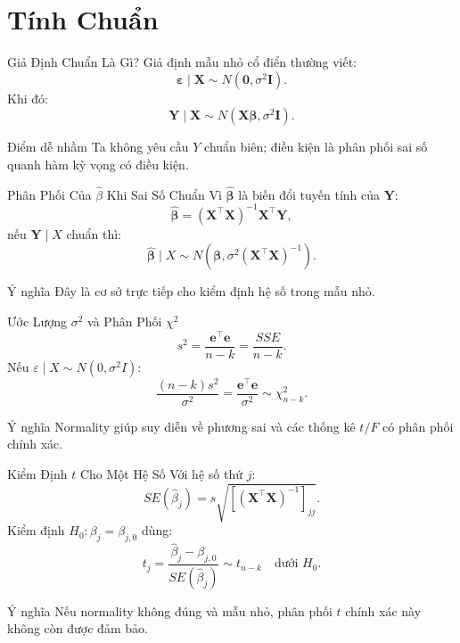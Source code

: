 \documentclass[aspectratio=169,professionalfonts]{beamer}
\newcommand{\assumption}[2]{%
  \begin{block}{#1}
    #2
  \end{block}
}
\newcommand{\mathnote}[1]{%
  \begin{block}{Ý nghĩa}
    #1
  \end{block}
}
\begin{document}
\section{Tính Chuẩn}
\begin{frame}{Giả Định Chuẩn Là Gì?}
  \small
  Giả định mẫu nhỏ cổ điển thường viết:
  \[
    \boldsymbol{\varepsilon}\mid\mathbf{X}\sim
    N(\mathbf{0},\sigma^2\mathbf{I}).
  \]
  Khi đó:
  \[
    \mathbf{Y}\mid\mathbf{X}
    \sim
    N(\mathbf{X}\boldsymbol{\beta},\sigma^2\mathbf{I}).
  \]
  \assumption{Điểm dễ nhầm}{Ta không yêu cầu $Y$ chuẩn biên; điều kiện là phân phối sai số quanh hàm kỳ vọng có điều kiện.}
\end{frame}

\begin{frame}{Phân Phối Của \texorpdfstring{$\hat\beta$}{beta-hat} Khi Sai Số Chuẩn}
  \small
  Vì $\hat{\boldsymbol{\beta}}$ là biến đổi tuyến tính của $\mathbf{Y}$:
  \[
    \hat{\boldsymbol{\beta}}
    =
    (\mathbf{X}^{\top}\mathbf{X})^{-1}\mathbf{X}^{\top}\mathbf{Y},
  \]
  nếu $\mathbf{Y}\mid X$ chuẩn thì:
  \[
    \hat{\boldsymbol{\beta}}\mid X
    \sim
    N\left(
      \boldsymbol{\beta},
      \sigma^2(\mathbf{X}^{\top}\mathbf{X})^{-1}
    \right).
  \]
  \mathnote{Đây là cơ sở trực tiếp cho kiểm định hệ số trong mẫu nhỏ.}
\end{frame}

\begin{frame}{Ước Lượng \texorpdfstring{$\sigma^2$}{sigma2} và Phân Phối \texorpdfstring{$\chi^2$}{chi-square}}
  \small
  \[
    s^2=\frac{\mathbf{e}^{\top}\mathbf{e}}{n-k}
    =\frac{SSE}{n-k}.
  \]
  Nếu $\varepsilon\mid X\sim N(0,\sigma^2I)$:
  \[
    \frac{(n-k)s^2}{\sigma^2}
    =
    \frac{\mathbf{e}^{\top}\mathbf{e}}{\sigma^2}
    \sim
    \chi^2_{n-k}.
  \]
  \begin{block}{Ý nghĩa}
    Normality giúp suy diễn về phương sai và các thống kê $t/F$ có phân phối chính xác.
  \end{block}
\end{frame}

\begin{frame}{Kiểm Định \texorpdfstring{$t$}{t} Cho Một Hệ Số}
  \small
  Với hệ số thứ $j$:
  \[
    SE(\hat\beta_j)=s\sqrt{[(\mathbf{X}^{\top}\mathbf{X})^{-1}]_{jj}}.
  \]
  Kiểm định $H_0:\beta_j=\beta_{j,0}$ dùng:
  \[
    t_j
    =
    \frac{\hat\beta_j-\beta_{j,0}}{SE(\hat\beta_j)}
    \sim t_{n-k}
    \quad \text{dưới }H_0.
  \]
  \mathnote{Nếu normality không đúng và mẫu nhỏ, phân phối $t$ chính xác này không còn được đảm bảo.}
\end{frame}
\end{document}
